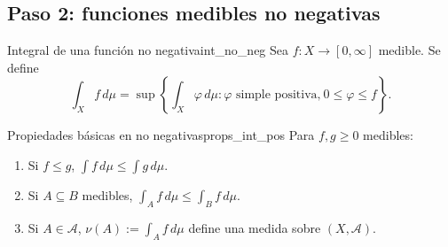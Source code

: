 \documentclass[11pt, a4paper]{article}
\begin{document}
\subsection{Paso 2: funciones medibles no negativas}

\begin{definicion}{Integral de una función no negativa}{int_no_neg}
Sea $f: X \to [0, \infty]$ medible. Se define
$$ \int_X f \, d\mu = \sup\left\{ \int_X \varphi \, d\mu : \varphi \text{ simple positiva,}
\ 0 \le \varphi \le f \right\}. $$
\end{definicion}

\begin{proposicion}{Propiedades básicas en no negativas}{props_int_pos}
Para $f, g \ge 0$ medibles:
\begin{enumerate}
    \item Si $f \le g$, $\int f \, d\mu \le \int g \, d\mu$.
    \item Si $A \subseteq B$ medibles, $\int_A f \, d\mu \le \int_B f \, d\mu$.
    \item Si $A \in \mathcal{A}$, $\nu(A) := \int_A f \, d\mu$ define una medida sobre
    $(X, \mathcal{A})$.
\end{enumerate}
\end{proposicion}
\end{document}
